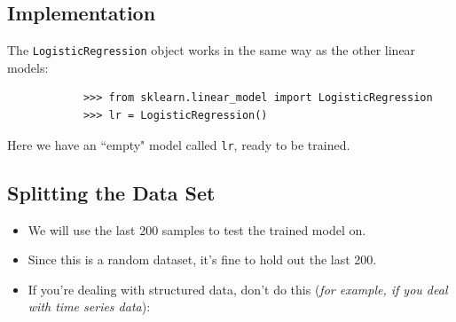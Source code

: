 \documentclass[SKL-MASTER.tex]{subfiles}
\begin{document}
	\subsection*{Implementation}
	The \texttt{LogisticRegression} object works in the same way as the other linear models:
	{
		\large
		\begin{framed}
			\begin{verbatim}
			>>> from sklearn.linear_model import LogisticRegression
			>>> lr = LogisticRegression()
			\end{verbatim}
		\end{framed}
	}
	\noindent Here we have an ``empty" model called \texttt{lr}, ready to be trained.
	\subsection*{Splitting the Data Set}
	\begin{itemize}
		\item We will use the last 200 samples to test the trained
		model on. 
		\item Since this is a random dataset, it's fine to hold out the last 200.
		\item If you're dealing
		with structured data, don't do this (\textit{for example, if you deal with time series data}):
	\end{itemize}
	
\end{document}
